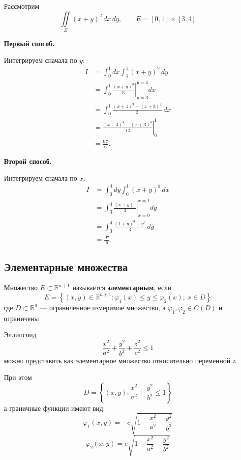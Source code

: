 \documentclass[12pt,a4paper]{article}
\begin{document}
\begin{example}
    Рассмотрим
    \[
        \iint\limits_E(x+y)^2\,dx\,dy,
        \qquad
        E=[0,1]\times[3,4]
    \]

    \textbf{Первый способ.}

    Интегрируем сначала по $y$:
    \begin{align*}
        I
        &=\int_0^1dx\int_3^4(x+y)^2\,dy\\
        &=\int_0^1
        \left.\frac{(x+y)^3}{3}\right|_{y=3}^{y=4}dx\\
        &=\int_0^1
        \frac{(x+4)^3-(x+3)^3}{3}\,dx\\
        &=\left.
        \frac{(x+4)^4-(x+3)^4}{12}
        \right|_0^1\\
        &=\frac{97}{6}.
    \end{align*}

    \textbf{Второй способ.}

    Интегрируем сначала по $x$:
    \begin{align*}
        I
        &=\int_3^4dy\int_0^1(x+y)^2\,dx\\
        &=\int_3^4
        \left.\frac{(x+y)^3}{3}\right|_{x=0}^{x=1}dy\\
        &=\int_3^4\frac{(1+y)^3-y^3}{3}\,dy\\
        &=\frac{97}{6}.
    \end{align*}
\end{example}

\newpage

\subsection{Элементарные множества}

\begin{definition}
    Множество $E\subset\mathbb R^{n+1}$ называется
    \textbf{элементарным}, если
    \[
        E=
        \left\{
        (x,y)\in\mathbb R^{n+1}:
        \varphi_1(x)\leqslant y\leqslant\varphi_2(x),
        \ x\in D
        \right\}
    \]
    где $D\subset\mathbb R^n$ --- ограниченное измеримое
    множество, а
    $\varphi_1,\varphi_2\in C(D)$ и ограничены
\end{definition}

\begin{example}
    Эллипсоид
    \[
        \frac{x^2}{a^2}
        +\frac{y^2}{b^2}
        +\frac{z^2}{c^2}\leqslant1
    \]
    можно представить как элементарное множество
    относительно переменной $z$.

    При этом
    \[
        D=\left\{
        (x,y):
        \frac{x^2}{a^2}+\frac{y^2}{b^2}\leqslant1
        \right\}
    \]
    а граничные функции имеют вид
    \[
        \varphi_1(x,y)
        =-c\sqrt{1-\frac{x^2}{a^2}-\frac{y^2}{b^2}}
    \]
    \[
        \varphi_2(x,y)
        =c\sqrt{1-\frac{x^2}{a^2}-\frac{y^2}{b^2}}
    \]
\end{example}
\end{document}
